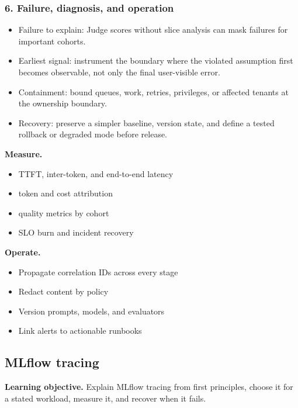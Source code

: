 \subsubsection*{6. Failure, diagnosis, and operation}
\begin{itemize}
\item Failure to explain: Judge scores without slice analysis can mask failures for important cohorts.
\item Earliest signal: instrument the boundary where the violated assumption first becomes observable, not only the final user-visible error.
\item Containment: bound queues, work, retries, privileges, or affected tenants at the ownership boundary.
\item Recovery: preserve a simpler baseline, version state, and define a tested rollback or degraded mode before release.
\end{itemize}
\textbf{Measure.}\begin{itemize}
\item TTFT, inter-token, and end-to-end latency
\item token and cost attribution
\item quality metrics by cohort
\item SLO burn and incident recovery
\end{itemize}
\textbf{Operate.}\begin{itemize}
\item Propagate correlation IDs across every stage
\item Redact content by policy
\item Version prompts, models, and evaluators
\item Link alerts to actionable runbooks
\end{itemize}
\subsection{MLflow tracing}
\textbf{Learning objective.} Explain MLflow tracing from first principles, choose it for a stated workload, measure it, and recover when it fails.
